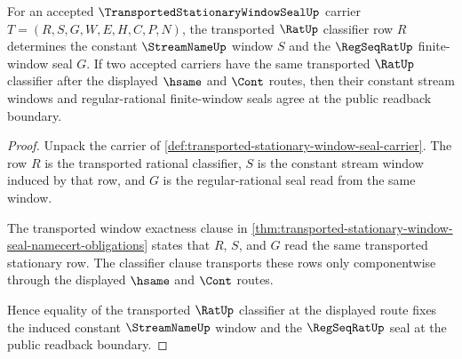 \begin{theorem}
\label{thm:transported-stationary-window-seal-readback-determinacy}
For an accepted $\TransportedStationaryWindowSealUp$ carrier $T=(R,S,G,W,E,H,C,P,N)$, the transported $\RatUp$ classifier row $R$ determines the constant $\StreamNameUp$ window $S$ and the $\RegSeqRatUp$ finite-window seal $G$. If two accepted carriers have the same transported $\RatUp$ classifier after the displayed $\hsame$ and $\Cont$ routes, then their constant stream windows and regular-rational finite-window seals agree at the public readback boundary.
\end{theorem}
\begin{proof}
Unpack the carrier of \autoref{def:transported-stationary-window-seal-carrier}. The row $R$ is the transported rational classifier, $S$ is the constant stream window induced by that row, and $G$ is the regular-rational seal read from the same window.

The transported window exactness clause in \autoref{thm:transported-stationary-window-seal-namecert-obligations} states that $R$, $S$, and $G$ read the same transported stationary row. The classifier clause transports these rows only componentwise through the displayed $\hsame$ and $\Cont$ routes.

Hence equality of the transported $\RatUp$ classifier at the displayed route fixes the induced constant $\StreamNameUp$ window and the $\RegSeqRatUp$ seal at the public readback boundary.
\end{proof}


